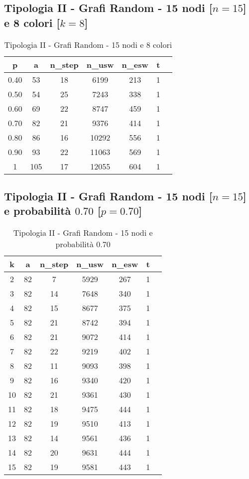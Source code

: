 \subsection{Tipologia II - Grafi Random - 15 nodi [$n=15$] e 8 colori [$k=8$]}

\begin{table}[H]
\centering
\begin{tabular}{|c|c|c|c|c|c|c|}
\hline
\textbf{p} & \textbf{a} & \textbf{n\_step} & \textbf{n\_usw} & \textbf{n\_esw} & \textbf{t} \\ \hline
0.40 & 53 & 18 & 6199 & 213 & 1 \\ \hline
0.50 & 54 & 25 & 7243 & 338 & 1 \\ \hline
0.60 & 69 & 22 & 8747 & 459 & 1 \\ \hline
0.70 & 82 & 21 & 9376 & 414 & 1 \\ \hline
0.80 & 86 & 16 & 10292 & 556 & 1 \\ \hline
0.90 & 93 & 22 & 11063 & 569 & 1 \\ \hline
1 & 105 & 17 & 12055 & 604 & 1 \\ \hline
\end{tabular}
\caption{Tipologia II - Grafi Random - 15 nodi e 8 colori}
\label{tab:sperimentazione-tipo1-15nodi}
\end{table}

\subsection{Tipologia II - Grafi Random - 15 nodi [$n=15$] e probabilità $0.70$ [$p=0.70$]}

\begin{table}[H]
\centering
\begin{tabular}{|c|c|c|c|c|c|c|}
\hline
\textbf{k} & \textbf{a} & \textbf{n\_step} & \textbf{n\_usw} & \textbf{n\_esw} & \textbf{t} \\ \hline
2 & 82 & 7 & 5929 & 267 & 1 \\ \hline
3 & 82 & 14 & 7648 & 340 & 1 \\ \hline
4 & 82 & 15 & 8677 & 375 & 1 \\ \hline
5 & 82 & 21 & 8742 & 394 & 1 \\ \hline
6 & 82 & 21 & 9072 & 414 & 1 \\ \hline
7 & 82 & 22 & 9219 & 402 & 1 \\ \hline
8 & 82 & 11 & 9093 & 398 & 1 \\ \hline
9 & 82 & 16 & 9340 & 420 & 1 \\ \hline
10 & 82 & 21 & 9361 & 430 & 1 \\ \hline
11 & 82 & 18 & 9475 & 444 & 1 \\ \hline
12 & 82 & 19 & 9510 & 413 & 1 \\ \hline
13 & 82 & 14 & 9561 & 436 & 1 \\ \hline
14 & 82 & 20 & 9631 & 444 & 1 \\ \hline
15 & 82 & 19 & 9581 & 443 & 1 \\ \hline
\end{tabular}
\caption{Tipologia II - Grafi Random - 15 nodi e probabilità $0.70$}
\label{tab:sperimentazione-tipo1-15nodi}
\end{table}

